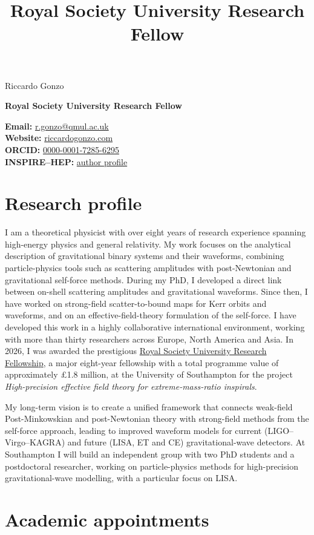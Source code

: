 \documentclass[11pt,a4paper,sans]{moderncv}
\title{Royal Society University Research Fellow}
\makeatletter
\newcommand{\cvheader}{%
  \noindent
  \begin{minipage}[t]{0.59\textwidth}
    \vspace{0pt}%
    {\fontsize{31}{33}\selectfont\color{CVInk}Riccardo Gonzo}\par
    \vspace{0.22em}%
    {\fontsize{12}{14}\selectfont\bfseries\color{CVOchre}Royal Society University Research Fellow}
  \end{minipage}\hfill
  \begin{minipage}[t]{0.38\textwidth}
    \vspace{0pt}%
    \raggedleft\fontsize{9.2}{11.2}\selectfont
    \textbf{Email:} \href{mailto:r.gonzo@qmul.ac.uk}{r.gonzo@qmul.ac.uk}\\
    \textbf{Website:} \href{https://riccardogonzo.com}{riccardogonzo.com}\\
    \textbf{ORCID:} \href{https://orcid.org/0000-0001-7285-6295}{0000-0001-7285-6295}\\
    \textbf{INSPIRE--HEP:} \href{https://inspirehep.net/authors/1812058?ui-citation-summary=true}{author profile}
  \end{minipage}%
  \par\vspace{0.78em}%
}
\makeatother
\begin{document}
\cvheader
\thispagestyle{cvfooter}

\section{Research profile}
I am a theoretical physicist with over eight years of research experience spanning high-energy physics and general relativity. My work focuses on the analytical description of gravitational binary systems and their waveforms, combining particle-physics tools such as scattering amplitudes with post-Newtonian and gravitational self-force methods. During my PhD, I developed a direct link between on-shell scattering amplitudes and gravitational waveforms. Since then, I have worked on strong-field scatter-to-bound maps for Kerr orbits and waveforms, and on an effective-field-theory formulation of the self-force. I have developed this work in a highly collaborative international environment, working with more than thirty researchers across Europe, North America and Asia. In 2026, I was awarded the prestigious \href{https://royalsociety.org/grants/university-research/}{Royal Society University Research Fellowship}, a major eight-year fellowship with a total programme value of approximately \pounds{}1.8 million, at the University of Southampton for the project \emph{High-precision effective field theory for extreme-mass-ratio inspirals}.

My long-term vision is to create a unified framework that connects weak-field Post-Minkowskian and post-Newtonian theory with strong-field methods from the self-force approach, leading to improved waveform models for current (LIGO--Virgo--KAGRA) and future (LISA, ET and CE) gravitational-wave detectors. At Southampton I will build an independent group with two PhD students and a postdoctoral researcher, working on particle-physics methods for high-precision gravitational-wave modelling, with a particular focus on LISA.

\section{Academic appointments}
\end{document}
